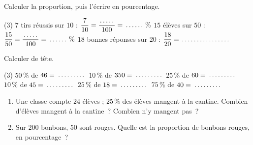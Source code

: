 \documentclass[a4paper,11pt,fleqn]{article}
\newcommand{\pt}[1][1.6cm]{\makebox[#1]{\dotfill}}
\newcommand{\ligne}{\par\smallskip\makebox[\linewidth]{\dotfill}\par}
\begin{document}
\begin{EXO}{}{}
Calculer la proportion, puis l'écrire en pourcentage.

\begin{tasks}[label=\textbf{\alph*.}, item-indent=2em, after-item-skip=0.5em](3)
	\task $7$ tirs réussis sur $10$ : \newline $\dfrac{7}{10} = \dfrac{\pt[0.8cm]}{100} = \pt[1cm]\,\%$
	\task $15$ élèves sur $50$ : \newline $\dfrac{15}{50} = \dfrac{\pt[0.8cm]}{100} = \pt[1cm]\,\%$
	\task $18$ bonnes réponses sur $20$ : \newline $\dfrac{18}{20} = \pt[2.5cm]$
\end{tasks}
\end{EXO}

\begin{EXO}{}{}
Calculer de tête.

\begin{tasks}[label=\textbf{\alph*.}, item-indent=2em, after-item-skip=0.5em](3)
	\task $50\,\%$ de $46 = \pt[1.5cm]$
	\task $10\,\%$ de $350 = \pt[1.5cm]$
	\task $25\,\%$ de $60 = \pt[1.5cm]$
	\task $10\,\%$ de $45 = \pt[1.5cm]$
	\task $25\,\%$ de $18 = \pt[1.5cm]$
	\task $75\,\%$ de $40 = \pt[1.5cm]$
\end{tasks}
\end{EXO}

\begin{EXO}{}{}
\begin{enumerate}[itemsep=0.3em]
	\item Une classe compte $24$ élèves ; $25\,\%$ des élèves mangent à la cantine. Combien d'élèves mangent à la cantine~? Combien n'y mangent pas~?
	\ligne
	\item Sur $200$ bonbons, $50$ sont rouges. Quelle est la proportion de bonbons rouges, en pourcentage~?
	\ligne
\end{enumerate}
\end{EXO}

\ifdefined\ELEVE\else
\clearpage
\end{document}
